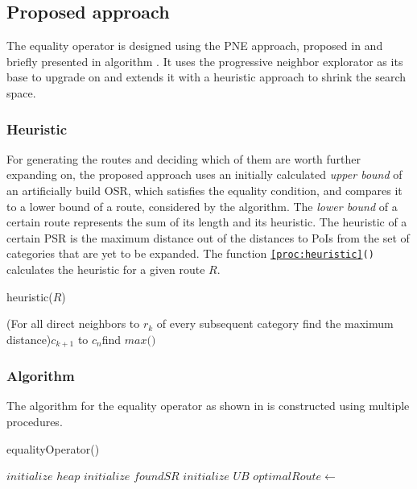 \subsection{Proposed approach} 
\label{sec:approachEO}
The equality operator is designed using the PNE approach, proposed in \cite{OSR} and briefly presented in algorithm \texttt{}. It uses the progressive neighbor explorator as its base to upgrade on and extends it with a heuristic approach to shrink the search space.

\subsubsection{Heuristic}
For generating the routes and deciding which of them are worth further expanding on, the proposed approach uses an initially calculated \textit{upper bound} of an artificially build OSR, which satisfies the equality condition, and compares it to a lower bound of a route, considered by the algorithm. The \textit{lower bound} of a certain route represents the sum of its length and its heuristic. The heuristic of a certain PSR is the maximum distance out of the distances to PoIs from the set of categories that are yet to be expanded. The function \texttt{\ref{proc:heuristic}()} calculates the heuristic for a given route $R$.

\begin{function}[htb!]
\caption{heuristic($R$)}
\label{proc:heuristic}

	\For(For all direct neighbors to $r_k$ of every subsequent category find the maximum distance){$c_{k+1}$ to $c_n$}{find $max($$)$\;}	

\end{function}

\subsubsection{Algorithm}

The algorithm for the equality operator as shown in \texttt{} is constructed using multiple procedures.

\begin{algorithm}[htb!]
\caption{equalityOperator()}
\label{alg:equality}
	
	
	\BlankLine
	
	$initialize$ $heap$ 
	$initialize$ $foundSR$ 
	$initialize$ $UB$\; 
	$optimalRoute \leftarrow$\;
	{
		\dummySR{}\;
		\modifiedPNE{}\;
	}

\end{algorithm}

